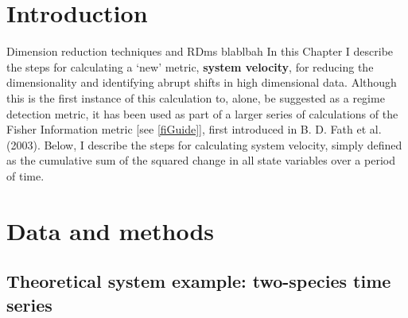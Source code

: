 \documentclass[12pt,twoside,openany]{reedthesis}
\begin{document}
\section{Introduction}\label{introduction-3}

Dimension reduction techniques and RDms blablbah In this Chapter I
describe the steps for calculating a `new' metric, \textbf{system
velocity}, for reducing the dimensionality and identifying abrupt shifts
in high dimensional data. Although this is the first instance of this
calculation to, alone, be suggested as a regime detection metric, it has
been used as part of a larger series of calculations of the Fisher
Information metric {[}see \ref{fiGuide}{]}, first introduced in B. D.
Fath et al. (2003). Below, I describe the steps for calculating system
velocity, simply defined as the cumulative sum of the squared change in
all state variables over a period of time.

\section{Data and methods}\label{data-and-methods-1}

\subsection{Theoretical system example: two-species time
series}\label{theoretical-system-example-two-species-time-series}
\end{document}

